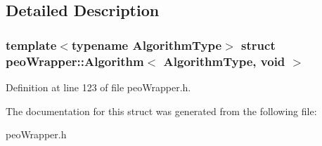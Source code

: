 \subsection{Detailed Description}
\subsubsection*{template$<$typename Algorithm\-Type$>$ struct peo\-Wrapper::Algorithm$<$ Algorithm\-Type, void $>$}





Definition at line 123 of file peo\-Wrapper.h.

The documentation for this struct was generated from the following file:\begin{CompactItemize}
\item 
peo\-Wrapper.h\end{CompactItemize}
